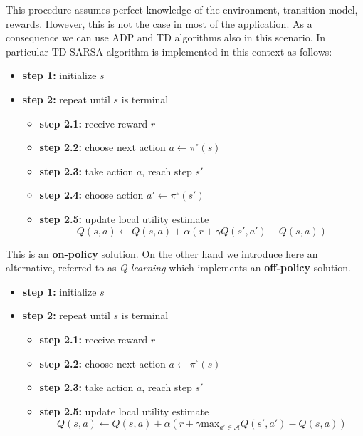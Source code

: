 This procedure assumes perfect knowledge of the environment, transition model, rewards.
However, this is not the case in most of the application. As a consequence we
can use ADP and TD algorithms also in this scenario. In particular TD SARSA algorithm
is implemented in this context as follows:

\begin{itemize}
	\item \textbf{step 1:} initialize $s$

	\item \textbf{step 2:} repeat until $s$ is terminal
		\begin{itemize}
			\item \textbf{step 2.1:} receive reward $r$

			\item \textbf{step 2.2:} choose next action
				$a \leftarrow \pi^{\epsilon}(s)$

			\item \textbf{step 2.3:} take action $a$, reach step $s'$

			\item \textbf{step 2.4:} choose action $a' \leftarrow \pi^{\epsilon}(s')$

			\item \textbf{step 2.5:} update local utility estimate
				\[
					Q(s,a) \leftarrow Q(s,a) + \alpha(r+ \gamma Q(s',a') - Q(s,a))
				\]
		\end{itemize}
\end{itemize}

This is an \textbf{on-policy} solution. On the other hand we introduce here an
alternative, referred to as \textit{Q-learning} which implements an \textbf{off-policy}
solution.

\begin{itemize}
	\item \textbf{step 1:} initialize $s$

	\item \textbf{step 2:} repeat until $s$ is terminal
		\begin{itemize}
			\item \textbf{step 2.1:} receive reward $r$

			\item \textbf{step 2.2:} choose next action
				$a \leftarrow \pi^{\epsilon}(s)$

			\item \textbf{step 2.3:} take action $a$, reach step $s'$

			\item \textbf{step 2.5:} update local utility estimate
				\[
					Q(s,a) \leftarrow Q(s,a) + \alpha(r+ \gamma \text{max}_{a' \in \mathcal{A}}
					Q(s',a') - Q(s,a))
				\]
		\end{itemize}
\end{itemize}


